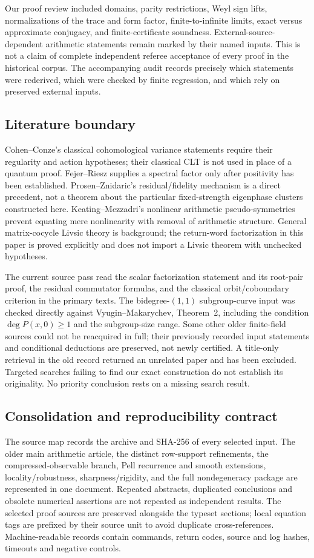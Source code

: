 Our proof review included domains, parity restrictions, Weyl sign lifts,
normalizations of the trace and form factor, finite-to-infinite limits,
exact versus approximate conjugacy, and finite-certificate soundness.
External-source-dependent arithmetic statements remain marked by their
named inputs. This is not a claim of complete independent referee acceptance
of every proof in the historical corpus. The accompanying audit records
precisely which statements were rederived, which were checked by finite
regression, and which rely on preserved external inputs.

\subsection{Literature boundary}
Cohen--Conze's classical cohomological variance statements require their
regularity and action hypotheses; their classical CLT is not used in place
of a quantum proof. Fejer--Riesz supplies a spectral factor only after
positivity has been established. Prosen--Znidaric's residual/fidelity
mechanism is a direct precedent, not a theorem about the particular
fixed-strength eigenphase clusters constructed here. Keating--Mezzadri's
nonlinear arithmetic pseudo-symmetries prevent equating mere nonlinearity
with removal of arithmetic structure. General matrix-cocycle Livsic theory
is background; the return-word factorization in this paper is proved
explicitly and does not import a Livsic theorem with unchecked hypotheses.

The current source pass read the scalar factorization statement and its
root-pair proof, the residual commutator formulas, and the classical
orbit/coboundary criterion in the primary texts. The bidegree-$(1,1)$ subgroup-curve input was checked directly against
Vyugin--Makarychev, Theorem~2, including the condition $\deg P(x,0)\geq1$
and the subgroup-size range. Some other older finite-field
sources could not be reacquired in full; their previously recorded input
statements and conditional deductions are preserved, not newly certified.
A title-only retrieval in the old record returned an unrelated paper and
has been excluded. Targeted searches failing to find our exact construction
do not establish its originality. No priority conclusion rests on a missing
search result.

\subsection{Consolidation and reproducibility contract}
The source map records the archive and SHA-256 of every selected input.
The older main arithmetic article, the distinct row-support refinements,
the compressed-observable branch, Pell recurrence and smooth extensions,
locality/robustness, sharpness/rigidity, and the full nondegeneracy package
are represented in one document. Repeated abstracts, duplicated conclusions
and obsolete numerical assertions are not repeated as independent results.
The selected proof sources are preserved alongside the typeset sections;
local equation tags are prefixed by their source unit to avoid duplicate
cross-references. Machine-readable records contain commands, return codes,
source and log hashes, timeouts and negative controls.

